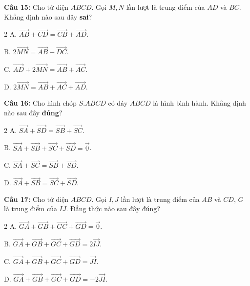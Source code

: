 \documentclass[12pt]{article}
\begin{document}
	\noindent\textbf{Câu 15:} Cho tứ diện $ABCD$. Gọi $M, N$ lần lượt là trung điểm của $AD$ và $BC$. Khẳng định nào sau đây \textbf{sai}?
	\begin{multicols}{2}
		A. $\overrightarrow{AB} + \overrightarrow{CD} = \overrightarrow{CB} + \overrightarrow{AD}$. \par
		B. $2\overrightarrow{MN} = \overrightarrow{AB} + \overrightarrow{DC}$. \par
		C. $\overrightarrow{AD} + 2\overrightarrow{MN} = \overrightarrow{AB} + \overrightarrow{AC}$. \par
		D. $2\overrightarrow{MN} = \overrightarrow{AB} + \overrightarrow{AC} + \overrightarrow{AD}$.
	\end{multicols}
	
	\vspace{0.2cm}
	\noindent\textbf{Câu 16:} Cho hình chóp $S.ABCD$ có đáy $ABCD$ là hình bình hành. Khẳng định nào sau đây \textbf{đúng}?
	\begin{multicols}{2}
		A. $\overrightarrow{SA} + \overrightarrow{SD} = \overrightarrow{SB} + \overrightarrow{SC}$. \par
		B. $\overrightarrow{SA} + \overrightarrow{SB} + \overrightarrow{SC} + \overrightarrow{SD} = \vec{0}$. \par
		C. $\overrightarrow{SA} + \overrightarrow{SC} = \overrightarrow{SB} + \overrightarrow{SD}$. \par
		D. $\overrightarrow{SA} + \overrightarrow{SB} = \overrightarrow{SC} + \overrightarrow{SD}$.
	\end{multicols}
	
	\vspace{0.2cm}
	\noindent\textbf{Câu 17:} Cho tứ diện $ABCD$. Gọi $I, J$ lần lượt là trung điểm của $AB$ và $CD$, $G$ là trung điểm của $IJ$. Đẳng thức nào sau đây đúng?
	\begin{multicols}{2}
		A. $\overrightarrow{GA} + \overrightarrow{GB} + \overrightarrow{GC} + \overrightarrow{GD} = \vec{0}$. \par
		B. $\overrightarrow{GA} + \overrightarrow{GB} + \overrightarrow{GC} + \overrightarrow{GD} = 2\overrightarrow{IJ}$. \par
		C. $\overrightarrow{GA} + \overrightarrow{GB} + \overrightarrow{GC} + \overrightarrow{GD} = \overrightarrow{JI}$. \par
		D. $\overrightarrow{GA} + \overrightarrow{GB} + \overrightarrow{GC} + \overrightarrow{GD} = -2\overrightarrow{JI}$.
	\end{multicols}
	
\end{document}
